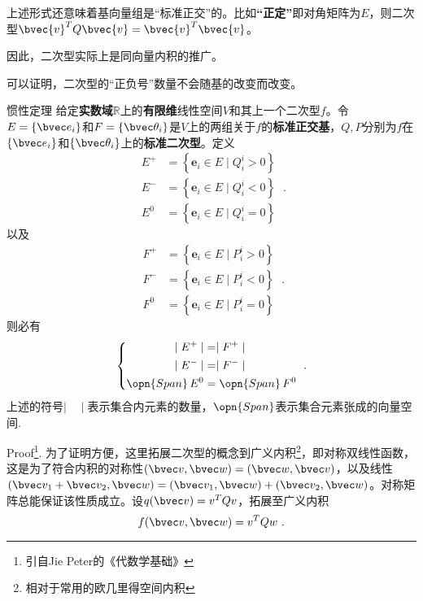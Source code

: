 上述形式还意味着基向量组是“标准正交”的。比如\textbf{“正定”}即对角矩阵为$E$，则二次型$\bvec{v}^{T}Q\bvec{v}=\bvec{v}^{T}\bvec{v}$。

因此，二次型实际上是同向量内积的推广。

可以证明，二次型的“正负号”数量不会随基的改变而改变。
\begin{theorem}{惯性定理}
给定\textbf{实数域}$\mathbb R$上的\textbf{有限维}线性空间$V$和其上一个二次型$f$。令$E=\{\bvec e_i\}$和$F=\{\bvec \theta_i\}$是$V$上的两组关于$f$的\textbf{标准正交基}，$Q,P$分别为$f$在$\{\bvec e_i\}$和$\{\bvec \theta_i\}$上的\textbf{标准二次型}。定义
\begin{equation}
\begin{aligned}
E^{+} & =\left\{\mathbf{e}_i \in E \mid Q^i_i>0\right\} \\
E^{-} & =\left\{\mathbf{e}_i \in E \mid Q^i_i<0\right\} \\
E^0 & =\left\{\mathbf{e}_i \in E \mid Q^i_i=0\right\}
\end{aligned}~.
\end{equation}
以及
\begin{equation}
\begin{aligned}
F^{+} & =\left\{\mathbf{e}_i \in E \mid P^i_i>0\right\} \\
F^{-} & =\left\{\mathbf{e}_i \in E \mid P^i_i<0\right\} \\
F^0 & =\left\{\mathbf{e}_i \in E \mid P^i_i=0\right\}
\end{aligned}~.
\end{equation}
则必有
\begin{equation}
\left\{
\begin{aligned}
\mid E^{+}\mid&=\mid F^{+}\mid\\
\mid E^{-}\mid&=\mid F^{-}\mid\\
\opn{Span}\, E^{0}&=\opn{Span}\, F^{0}\\
\end{aligned}\right.~.
\end{equation}
上述的符号$\mid \quad\mid$表示集合内元素的数量，$\opn{Span}$表示集合元素张成的向量空间.
\end{theorem}
Proof\footnote{引自Jie Peter的《代数学基础》}.
为了证明方便，这里拓展二次型的概念到广义内积\footnote{相对于常用的欧几里得空间内积}，即对称双线性函数，这是为了符合内积的对称性$(\bvec v,\bvec w)=(\bvec w,\bvec v)$，以及线性$(\bvec v_1+\bvec v_2,\bvec w)=(\bvec v_1,\bvec w)+(\bvec v_2,\bvec w)$。对称矩阵总能保证该性质成立。设$q(\bvec v)=v^T Q v$，拓展至广义内积
\begin{equation}
f(\bvec v,\bvec w)=v^T Q w~.
\end{equation}

